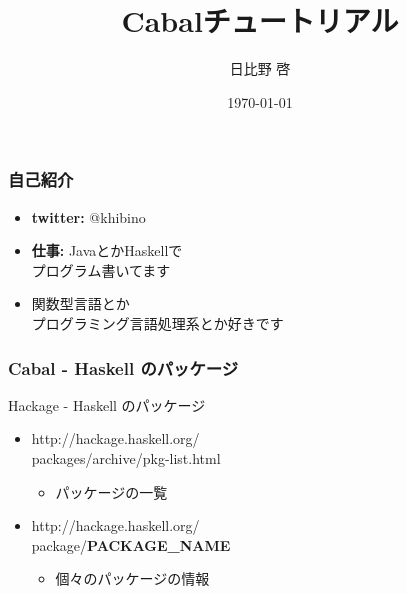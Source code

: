 \documentclass[cjk,dvipdfm,14pt]{beamer}
\title{Cabalチュートリアル}
\author{日比野 啓}
\date{ \today }
\begin{document}
\begin{frame}
\maketitle
\end{frame}

\begin{frame}
\frametitle{自己紹介}

\begin{itemize}
\item {\bf twitter:} @khibino
\item {\bf 仕事:} JavaとかHaskellで\\プログラム書いてます
\item 関数型言語とか\\プログラミング言語処理系とか好きです
\end{itemize}

\end{frame}









\begin{frame}
\frametitle{Cabal - Haskell のパッケージ}

Hackage - Haskell のパッケージ

\begin{itemize}
\item http://hackage.haskell.org/\\packages/archive/pkg-list.html
  \begin{itemize}
  \item パッケージの一覧
  \end{itemize}
\item http://hackage.haskell.org/\\package/{\bf PACKAGE\_NAME}
  \begin{itemize}
  \item 個々のパッケージの情報
  \end{itemize}
\end{itemize}

\end{frame}
\end{document}
